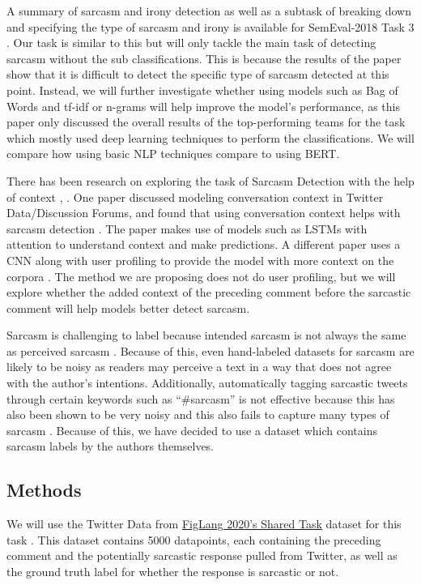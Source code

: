 \documentclass[11pt,a4paper]{article}
\begin{document}
A summary of sarcasm and irony detection as well as a subtask of breaking down and specifying the type of sarcasm and irony is available for SemEval-2018 Task 3 \cite{van-hee-etal-2018-semeval}. Our task is similar to this but will only tackle the main task of detecting sarcasm without the sub classifications. This is because the results of the paper show that it is difficult to detect the specific type of sarcasm detected at this point. Instead, we will further investigate whether using models such as Bag of Words and tf-idf or n-grams will help improve the model's performance, as this paper only discussed the overall results of the top-performing teams for the task which mostly used deep learning techniques to perform the classifications. We will compare how using basic NLP techniques compare to using BERT.

There has been research on exploring the task of Sarcasm Detection with the help of context \cite{Ghosh-Muresan}, \cite{hazarika}. One paper discussed modeling conversation context in Twitter Data/Discussion Forums, and found that using conversation context helps with sarcasm detection \cite{Ghosh-Muresan}. The paper makes use of models such as LSTMs with attention to understand context and make predictions. A different paper uses a CNN along with user profiling to provide the model with more context on the corpora \cite{hazarika}. The method we are proposing does not do user profiling, but we will explore whether the added context of the preceding comment before the sarcastic comment will help models better detect sarcasm.

Sarcasm is challenging to label because intended sarcasm is not always the same as perceived sarcasm \cite{oprea}. Because of this, even hand-labeled datasets for sarcasm are likely to be noisy as readers may perceive a text in a way that does not agree with the author's intentions. Additionally, automatically tagging sarcastic tweets through certain keywords such as ``\#sarcasm'' is not effective because this has also been shown to be very noisy and this also fails to capture many types of sarcasm \cite{oprea}. Because of this, we have decided to use a dataset which contains sarcasm labels by the authors themselves.

\subsection{Methods}
We will use the Twitter Data from \href{https://sites.google.com/view/figlang2020/}{FigLang 2020's Shared Task} dataset for this task \cite{Ghosh-Muresan}. This dataset contains 5000 datapoints, each containing the preceding comment and the potentially sarcastic response pulled from Twitter, as well as the ground truth label for whether the response is sarcastic or not.
\end{document}
